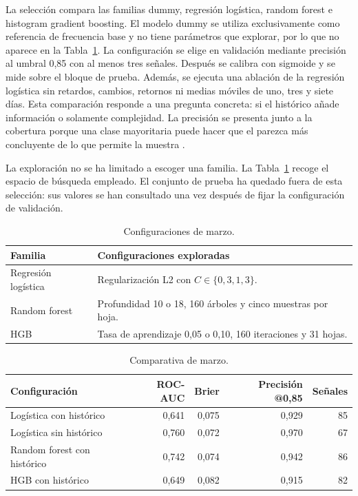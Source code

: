 La selección compara las familias dummy, regresión logística, random forest e histogram gradient boosting. El modelo dummy se utiliza exclusivamente como referencia de frecuencia base y no tiene parámetros que explorar, por lo que no aparece en la Tabla~\ref{tab:configuraciones-marzo}. La configuración se elige en validación mediante precisión al umbral 0,85 con al menos tres señales. Después se calibra con sigmoide y se mide sobre el bloque de prueba. Además, se ejecuta una ablación de la regresión logística sin retardos, cambios, retornos ni medias móviles de uno, tres y siete días. Esta comparación responde a una pregunta concreta: si el histórico añade información o solamente complejidad. La precisión se presenta junto a la cobertura porque una clase mayoritaria puede hacer que el  parezca más concluyente de lo que permite la muestra \cite{saito2015pr}.

La exploración no se ha limitado a escoger una familia. La Tabla~\ref{tab:configuraciones-marzo} recoge el espacio de búsqueda empleado. El conjunto de prueba ha quedado fuera de esta selección: sus valores se han consultado una vez después de fijar la configuración de validación.

\begin{table}[htbp]
\centering
\begin{tabularx}{\textwidth}{>{\raggedright\arraybackslash}p{} >{\raggedright\arraybackslash}X}
\toprule
Familia & Configuraciones exploradas \\
\midrule
Regresión logística & Regularización L2 con $C \in \{0{,}3, 1, 3\}$. \\
Random forest & Profundidad 10 o 18, 160 árboles y cinco muestras por hoja. \\
HGB & Tasa de aprendizaje 0,05 o 0,10, 160 iteraciones y 31 hojas. \\
\bottomrule
\end{tabularx}
\caption{Configuraciones de marzo.}
\label{tab:configuraciones-marzo}
\end{table}

\begin{table}[htbp]
\centering
\begin{tabular}{l r r r r}
\toprule
Configuración & ROC-AUC & Brier & Precisión @0,85 & Señales \\
\midrule
Logística con histórico & 0,641 & 0,075 & 0,929 & 85 \\
Logística sin histórico & 0,760 & 0,072 & 0,970 & 67 \\
Random forest con histórico & 0,742 & 0,074 & 0,942 & 86 \\
HGB con histórico & 0,649 & 0,082 & 0,915 & 82 \\
\bottomrule
\end{tabular}
\caption{Comparativa de marzo.}
\label{tab:resultados-marzo}
\end{table}

